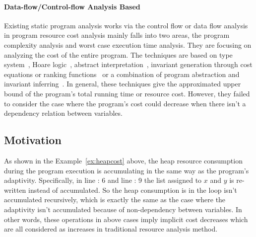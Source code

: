\paragraph*{Data-flow/Control-flow Analysis Based}
Existing static program analysis works via the control flow or data flow analysis 
in program resource cost analysis 
mainly falls into two areas, the program complexity analysis and worst case execution time analysis. 
They are focusing on analyzing the cost of the entire program. 
The techniques are based on
type system~\cite{CicekBG0H17, RajaniG0021}, Hoare logic~\cite{CarbonneauxHS15}, abstract interpretation~\cite{GustafssonEL05, HumenbergerJK18},
invariant generation through cost equations or ranking functions~\cite{BrockschmidtEFFG16,AlbertAGP08,AliasDFG10,Flores-MontoyaH14}
or a combination of program abstraction and invariant inferring~\cite{GulwaniZ10, SinnZV17,GulwaniJK09}.
In general, these techniques give the approximated upper bound of the program's total running time or resource cost.
However, they failed to consider the case where the program's cost could decrease when there isn't a dependency relation between variables.

\subsection{Motivation}
\label{subsubsec:furthers-cost-example}
As shown in the Example~\ref{ex:heapcost} above, the heap resource consumption during the program 
execution is accumulating in the same way as the program's adaptivity. 
Specifically, in line : 6 and line :  9
the list assigned to $x$ and $y$ is re-written instead of accumulated.
So the heap consumption is in the loop isn't accumulated recursively, which is exactly
the same as the case where the adaptivity isn't accumulated because of non-dependency between variables.
In other words, these operations in above cases imply implicit cost decreases 
which are all considered as increases in traditional resource analysis 
method.


